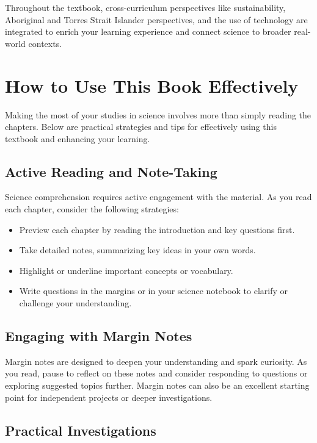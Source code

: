 Throughout the textbook, cross-curriculum perspectives like sustainability, Aboriginal and Torres Strait Islander perspectives, and the use of technology are integrated to enrich your learning experience and connect science to broader real-world contexts.

\section{How to Use This Book Effectively}

Making the most of your studies in science involves more than simply reading the chapters. Below are practical strategies and tips for effectively using this textbook and enhancing your learning.

\subsection{Active Reading and Note-Taking}

Science comprehension requires active engagement with the material. As you read each chapter, consider the following strategies:

\begin{itemize}
    \item Preview each chapter by reading the introduction and key questions first.
    \item Take detailed notes, summarizing key ideas in your own words.
    \item Highlight or underline important concepts or vocabulary.
    \item Write questions in the margins or in your science notebook to clarify or challenge your understanding.
\end{itemize}

\subsection{Engaging with Margin Notes}

Margin notes are designed to deepen your understanding and spark curiosity. As you read, pause to reflect on these notes and consider responding to questions or exploring suggested topics further. Margin notes can also be an excellent starting point for independent projects or deeper investigations.

\subsection{Practical Investigations}

